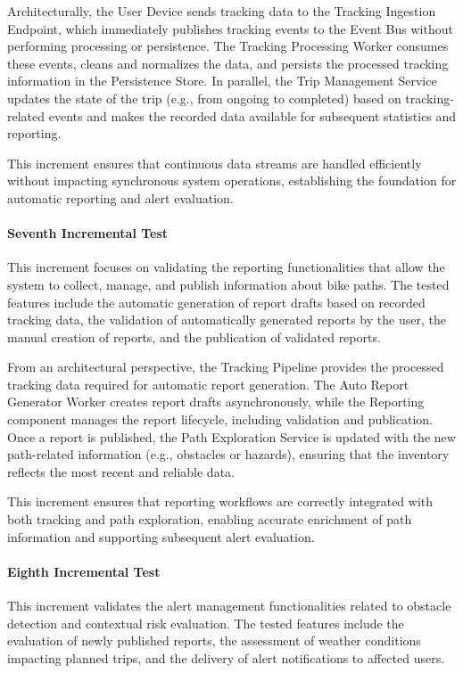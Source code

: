 Architecturally, the User Device sends tracking data to the Tracking Ingestion Endpoint, which immediately publishes tracking events to the Event Bus without performing processing or persistence. The Tracking Processing Worker consumes these events, cleans and normalizes the data, and persists the processed tracking information in the Persistence Store. In parallel, the Trip Management Service updates the state of the trip (e.g., from ongoing to completed) based on tracking-related events and makes the recorded data available for subsequent statistics and reporting.

This increment ensures that continuous data streams are handled efficiently without impacting synchronous system operations, establishing the foundation for automatic reporting and alert evaluation.

\paragraph{Seventh Incremental Test}
This increment focuses on validating the reporting functionalities that allow the system to collect, manage, and publish information about bike paths. The tested features include the automatic generation of report drafts based on recorded tracking data, the validation of automatically generated reports by the user, the manual creation of reports, and the publication of validated reports.

From an architectural perspective, the Tracking Pipeline provides the processed tracking data required for automatic report generation. The Auto Report Generator Worker creates report drafts asynchronously, while the Reporting component manages the report lifecycle, including validation and publication. Once a report is published, the Path Exploration Service is updated with the new path-related information (e.g., obstacles or hazards), ensuring that the inventory reflects the most recent and reliable data.

This increment ensures that reporting workflows are correctly integrated with both tracking and path exploration, enabling accurate enrichment of path information and supporting subsequent alert evaluation.

\paragraph{Eighth Incremental Test}
This increment validates the alert management functionalities related to obstacle detection and contextual risk evaluation. The tested features include the evaluation of newly published reports, the assessment of weather conditions impacting planned trips, and the delivery of alert notifications to affected users.

